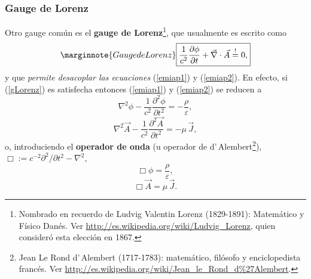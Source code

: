 \subsubsection{Gauge de Lorenz}
Otro gauge común es el \textbf{gauge de Lorenz}\footnote{Nombrado en recuerdo de Ludvig Valentin Lorenz (1829-1891): Matemático y Físico Danés. Ver \url{http://es.wikipedia.org/wiki/Ludvig_Lorenz}, quien consideró esta elección en 1867.}, que usualmente es escrito como
\begin{equation}\marginnote{Gauge de Lorenz}\label{gLorenz}
\boxed{\frac{1}{c^2}\frac{\partial\phi}{\partial t}+\vec{\nabla}\cdot\vec{A}\stackrel{!}{=}0,}
\end{equation}
y que \textit{permite desacoplar las ecuaciones} (\ref{emiap1}) y (\ref{emiap2}).
En efecto, si (\ref{gLorenz}) es satisfecha entonces (\ref{emiap1}) y (\ref{emiap2}) se reducen a
\begin{equation}\label{emiap1gL}
 \nabla^2\phi-\frac{1}{c^2}\frac{\partial^2\phi}{\partial t^2}=-\frac{\rho}{\varepsilon},
\end{equation}
\begin{equation}\label{emiap2gL}
 \nabla^2\vec{A}-\frac{1}{c^2}\frac{\partial^2\vec{A}}{\partial t^2}=-\mu\,\vec{J},
\end{equation}
o, introduciendo el \textbf{operador de onda} (u operador de  d'\,Alembert\footnote{Jean Le Rond d'\,Alembert (1717-1783): matemático, filósofo y enciclopedista francés. Ver \url{http://es.wikipedia.org/wiki/Jean_le_Rond_d\%27Alembert}.}), 
$\Box:= c^{-2}{\partial^2}/{\partial t^2}-\nabla^2$,
\begin{equation}\label{emiap1gL2}
 \Box\phi=\frac{\rho}{\varepsilon},
\end{equation}
\begin{equation}\label{emiap2gL2}
 \Box\vec{A}=\mu\,\vec{J}.
\end{equation}

